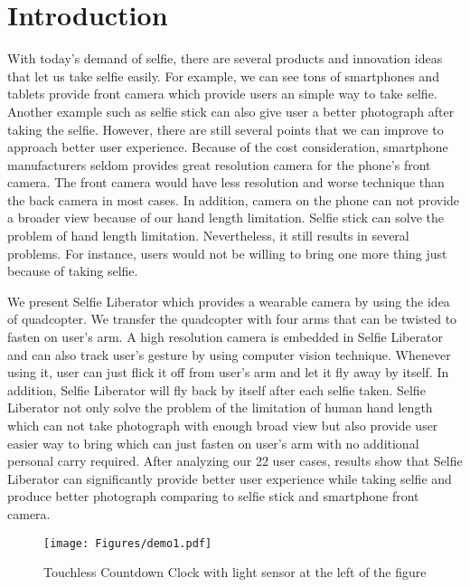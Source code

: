 \documentclass{sig-alternate-ipsn13}
\begin{document}
\section{Introduction}

With today's demand of selfie, there are several products and innovation ideas that let us take selfie easily. For example, we can see tons of smartphones and tablets provide front camera which provide users an simple way to take selfie. Another example such as selfie stick can also give user a better photograph after taking the selfie. However, there are still several points that we can improve to approach better user experience. Because of the cost consideration, smartphone manufacturers seldom provides great resolution camera for the phone's front camera. The front camera would have less resolution and worse technique than the back camera in most cases. In addition, camera on the phone can not provide a broader view because of our hand length limitation. Selfie stick can solve the problem of hand length limitation. Nevertheless, it still results in several problems. For instance, users would not be willing to bring one more thing just because of taking selfie. 

We present Selfie Liberator which provides a wearable camera by using the idea of quadcopter. We transfer the quadcopter with four arms that can be twisted to fasten on user's arm. A high resolution camera is embedded in Selfie Liberator and can also track user's gesture by using computer vision technique. Whenever using it, user can just flick it off from user's arm and let it fly away by itself. In addition, Selfie Liberator will fly back by itself after each selfie taken. Selfie Liberator not only solve the problem of the limitation of human hand length which can not take photograph with enough broad view but also provide user easier way to bring which can just fasten on user's arm with no additional personal carry required.
After analyzing our 22 user cases, results show that Selfie Liberator can significantly provide better user experience while taking selfie and produce better photograph comparing to selfie stick and smartphone front camera.



\begin{figure}
  \centering
  \texttt{[image: Figures/demo1.pdf]}
  \caption{Touchless Countdown Clock with light sensor at the left of the figure}
  \label{fig:demo1}
\end{figure}
\end{document}
